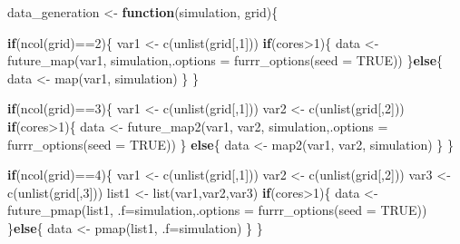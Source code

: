 \documentclass[11pt,a4paper]{article}
\newenvironment{Shaded}{\begin{snugshade}}{\end{snugshade}}
\newcommand{\AttributeTok}[1]{\textcolor[rgb]{0.77,0.63,0.00}{#1}}
\newcommand{\ConstantTok}[1]{\textcolor[rgb]{0.00,0.00,0.00}{#1}}
\newcommand{\ControlFlowTok}[1]{\textcolor[rgb]{0.13,0.29,0.53}{\textbf{#1}}}
\newcommand{\DecValTok}[1]{\textcolor[rgb]{0.00,0.00,0.81}{#1}}
\newcommand{\FunctionTok}[1]{\textcolor[rgb]{0.00,0.00,0.00}{#1}}
\newcommand{\NormalTok}[1]{#1}
\newcommand{\OtherTok}[1]{\textcolor[rgb]{0.56,0.35,0.01}{#1}}
\newcommand{\SpecialCharTok}[1]{\textcolor[rgb]{0.00,0.00,0.00}{#1}}
\begin{document}
\begin{Shaded}
\begin{Highlighting}[]
\NormalTok{data\_generation }\OtherTok{\textless{}{-}} \ControlFlowTok{function}\NormalTok{(simulation, grid)\{}
  
  \ControlFlowTok{if}\NormalTok{(}\FunctionTok{ncol}\NormalTok{(grid)}\SpecialCharTok{==}\DecValTok{2}\NormalTok{)\{}
\NormalTok{    var1 }\OtherTok{\textless{}{-}} \FunctionTok{c}\NormalTok{(}\FunctionTok{unlist}\NormalTok{(grid[,}\DecValTok{1}\NormalTok{]))}
    \ControlFlowTok{if}\NormalTok{(cores}\SpecialCharTok{\textgreater{}}\DecValTok{1}\NormalTok{)\{}
\NormalTok{      data }\OtherTok{\textless{}{-}} \FunctionTok{future\_map}\NormalTok{(var1, simulation,}\AttributeTok{.options =} \FunctionTok{furrr\_options}\NormalTok{(}\AttributeTok{seed =} \ConstantTok{TRUE}\NormalTok{))}
\NormalTok{    \}}\ControlFlowTok{else}\NormalTok{\{}
\NormalTok{      data }\OtherTok{\textless{}{-}} \FunctionTok{map}\NormalTok{(var1, simulation)}
\NormalTok{    \}}
\NormalTok{  \}}
  
  \ControlFlowTok{if}\NormalTok{(}\FunctionTok{ncol}\NormalTok{(grid)}\SpecialCharTok{==}\DecValTok{3}\NormalTok{)\{}
\NormalTok{    var1 }\OtherTok{\textless{}{-}} \FunctionTok{c}\NormalTok{(}\FunctionTok{unlist}\NormalTok{(grid[,}\DecValTok{1}\NormalTok{]))}
\NormalTok{    var2 }\OtherTok{\textless{}{-}} \FunctionTok{c}\NormalTok{(}\FunctionTok{unlist}\NormalTok{(grid[,}\DecValTok{2}\NormalTok{]))}
    \ControlFlowTok{if}\NormalTok{(cores}\SpecialCharTok{\textgreater{}}\DecValTok{1}\NormalTok{)\{}
\NormalTok{      data }\OtherTok{\textless{}{-}} \FunctionTok{future\_map2}\NormalTok{(var1, var2, simulation,}\AttributeTok{.options =} \FunctionTok{furrr\_options}\NormalTok{(}\AttributeTok{seed =} \ConstantTok{TRUE}\NormalTok{))}
\NormalTok{    \} }\ControlFlowTok{else}\NormalTok{\{}
\NormalTok{      data }\OtherTok{\textless{}{-}} \FunctionTok{map2}\NormalTok{(var1, var2, simulation)}
\NormalTok{    \}}
\NormalTok{  \} }
  
  \ControlFlowTok{if}\NormalTok{(}\FunctionTok{ncol}\NormalTok{(grid)}\SpecialCharTok{==}\DecValTok{4}\NormalTok{)\{}
\NormalTok{    var1 }\OtherTok{\textless{}{-}} \FunctionTok{c}\NormalTok{(}\FunctionTok{unlist}\NormalTok{(grid[,}\DecValTok{1}\NormalTok{]))}
\NormalTok{    var2 }\OtherTok{\textless{}{-}} \FunctionTok{c}\NormalTok{(}\FunctionTok{unlist}\NormalTok{(grid[,}\DecValTok{2}\NormalTok{]))}
\NormalTok{    var3 }\OtherTok{\textless{}{-}} \FunctionTok{c}\NormalTok{(}\FunctionTok{unlist}\NormalTok{(grid[,}\DecValTok{3}\NormalTok{]))}
\NormalTok{    list1 }\OtherTok{\textless{}{-}} \FunctionTok{list}\NormalTok{(var1,var2,var3)}
    \ControlFlowTok{if}\NormalTok{(cores}\SpecialCharTok{\textgreater{}}\DecValTok{1}\NormalTok{)\{}
\NormalTok{      data }\OtherTok{\textless{}{-}} \FunctionTok{future\_pmap}\NormalTok{(list1, }\AttributeTok{.f=}\NormalTok{simulation,}\AttributeTok{.options =} \FunctionTok{furrr\_options}\NormalTok{(}\AttributeTok{seed =} \ConstantTok{TRUE}\NormalTok{))}
\NormalTok{    \}}\ControlFlowTok{else}\NormalTok{\{}
\NormalTok{      data }\OtherTok{\textless{}{-}} \FunctionTok{pmap}\NormalTok{(list1, }\AttributeTok{.f=}\NormalTok{simulation)}
\NormalTok{    \}}
\NormalTok{  \}}
  

\end{Highlighting}
\end{Shaded}
\end{document}

